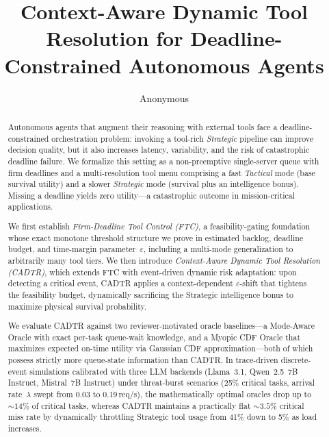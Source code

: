 \documentclass[preprint,12pt]{elsarticle}
\begin{document}
\begin{frontmatter}

\title{Context-Aware Dynamic Tool Resolution for Deadline-Constrained Autonomous Agents}


\author{Anonymous}


\begin{abstract}
Autonomous agents that augment their reasoning with external tools face a
deadline-constrained orchestration problem: invoking a tool-rich
\emph{Strategic} pipeline can improve decision quality, but it also
increases latency, variability, and the risk of catastrophic deadline
failure.  We formalize this setting as a non-preemptive single-server
queue with firm deadlines and a multi-resolution tool menu comprising a
fast \emph{Tactical} mode (base survival utility) and a slower
\emph{Strategic} mode (survival plus an intelligence bonus).  Missing a
deadline yields zero utility---a catastrophic outcome in
mission-critical applications.

We first establish \emph{Firm-Deadline Tool Control (FTC)}, a
feasibility-gating foundation whose exact monotone threshold structure
we prove in estimated backlog, deadline budget, and time-margin
parameter~$\varepsilon$, including a multi-mode generalization to
arbitrarily many tool tiers.  We then introduce \emph{Context-Aware
Dynamic Tool Resolution (CADTR)}, which extends FTC with event-driven
dynamic risk adaptation: upon detecting a critical event, CADTR
applies a context-dependent $\varepsilon$-shift that tightens the
feasibility budget, dynamically sacrificing the Strategic intelligence
bonus to maximize physical survival probability.

We evaluate CADTR against two reviewer-motivated oracle baselines---a
Mode-Aware Oracle with exact per-task queue-wait knowledge, and a
Myopic CDF Oracle that maximizes expected on-time utility via Gaussian
CDF approximation---both of which possess strictly more queue-state information
than CADTR.  In trace-driven discrete-event simulations calibrated
with three LLM backends (Llama~3.1, Qwen~2.5~7B Instruct,
Mistral~7B Instruct) under threat-burst scenarios (25\% critical
tasks, arrival rate~$\lambda$ swept from 0.03 to 0.19\,req/s), the
mathematically optimal oracles drop up to ${\sim}14\%$ of critical
tasks, whereas CADTR maintains a practically flat
${\sim}3.5\%$ critical miss rate by dynamically throttling Strategic
tool usage from 41\% down to 5\% as load increases.
\end{abstract}


\end{frontmatter}
\end{document}
